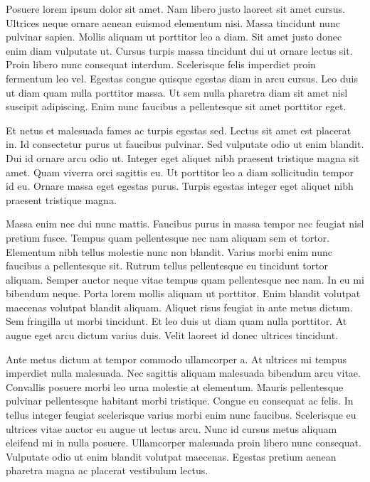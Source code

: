 \documentclass[11pt,a4paper]{article}
\begin{document}
Posuere lorem ipsum dolor sit amet. Nam libero justo laoreet sit amet cursus. Ultrices neque ornare aenean euismod elementum nisi. Massa tincidunt nunc pulvinar sapien. Mollis aliquam ut porttitor leo a diam. Sit amet justo donec enim diam vulputate ut. Cursus turpis massa tincidunt dui ut ornare lectus sit. Proin libero nunc consequat interdum. Scelerisque felis imperdiet proin fermentum leo vel. Egestas congue quisque egestas diam in arcu cursus. Leo duis ut diam quam nulla porttitor massa. Ut sem nulla pharetra diam sit amet nisl suscipit adipiscing. Enim nunc faucibus a pellentesque sit amet porttitor eget.

Et netus et malesuada fames ac turpis egestas sed. Lectus sit amet est placerat in. Id consectetur purus ut faucibus pulvinar. Sed vulputate odio ut enim blandit. Dui id ornare arcu odio ut. Integer eget aliquet nibh praesent tristique magna sit amet. Quam viverra orci sagittis eu. Ut porttitor leo a diam sollicitudin tempor id eu. Ornare massa eget egestas purus. Turpis egestas integer eget aliquet nibh praesent tristique magna.

Massa enim nec dui nunc mattis. Faucibus purus in massa tempor nec feugiat nisl pretium fusce. Tempus quam pellentesque nec nam aliquam sem et tortor. Elementum nibh tellus molestie nunc non blandit. Varius morbi enim nunc faucibus a pellentesque sit. Rutrum tellus pellentesque eu tincidunt tortor aliquam. Semper auctor neque vitae tempus quam pellentesque nec nam. In eu mi bibendum neque. Porta lorem mollis aliquam ut porttitor. Enim blandit volutpat maecenas volutpat blandit aliquam. Aliquet risus feugiat in ante metus dictum. Sem fringilla ut morbi tincidunt. Et leo duis ut diam quam nulla porttitor. At augue eget arcu dictum varius duis. Velit laoreet id donec ultrices tincidunt.

Ante metus dictum at tempor commodo ullamcorper a. At ultrices mi tempus imperdiet nulla malesuada. Nec sagittis aliquam malesuada bibendum arcu vitae. Convallis posuere morbi leo urna molestie at elementum. Mauris pellentesque pulvinar pellentesque habitant morbi tristique. Congue eu consequat ac felis. In tellus integer feugiat scelerisque varius morbi enim nunc faucibus. Scelerisque eu ultrices vitae auctor eu augue ut lectus arcu. Nunc id cursus metus aliquam eleifend mi in nulla posuere. Ullamcorper malesuada proin libero nunc consequat. Vulputate odio ut enim blandit volutpat maecenas. Egestas pretium aenean pharetra magna ac placerat vestibulum lectus.
\end{document}
